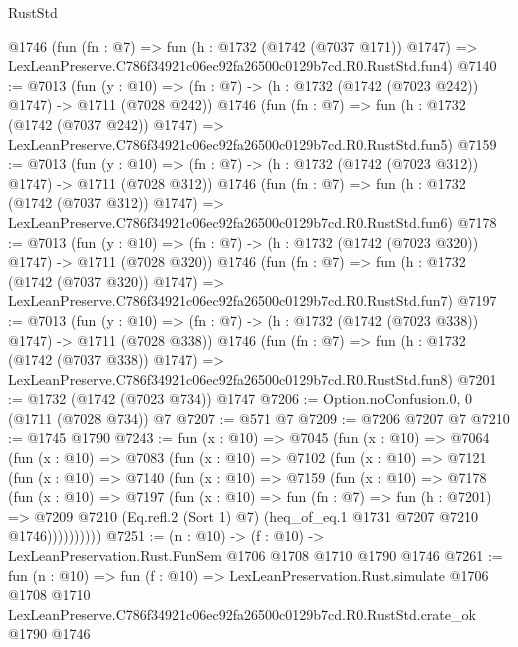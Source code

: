 \begin{lexlean}{RustStd}
\begin{coremodule}
    @1746
    (fun (fn : @7) =>
    fun (h : @1732 (@1742 (@7037 @171)) @1747) =>
    LexLeanPreserve.C786f34921c06ec92fa26500c0129b7cd.R0.RustStd.fun4)
@7140 := @7013
    (fun (y : @10) => (fn : @7) -> (h : @1732 (@1742 (@7023 @242)) @1747) -> @1711 (@7028 @242))
    @1746
    (fun (fn : @7) =>
    fun (h : @1732 (@1742 (@7037 @242)) @1747) =>
    LexLeanPreserve.C786f34921c06ec92fa26500c0129b7cd.R0.RustStd.fun5)
@7159 := @7013
    (fun (y : @10) => (fn : @7) -> (h : @1732 (@1742 (@7023 @312)) @1747) -> @1711 (@7028 @312))
    @1746
    (fun (fn : @7) =>
    fun (h : @1732 (@1742 (@7037 @312)) @1747) =>
    LexLeanPreserve.C786f34921c06ec92fa26500c0129b7cd.R0.RustStd.fun6)
@7178 := @7013
    (fun (y : @10) => (fn : @7) -> (h : @1732 (@1742 (@7023 @320)) @1747) -> @1711 (@7028 @320))
    @1746
    (fun (fn : @7) =>
    fun (h : @1732 (@1742 (@7037 @320)) @1747) =>
    LexLeanPreserve.C786f34921c06ec92fa26500c0129b7cd.R0.RustStd.fun7)
@7197 := @7013
    (fun (y : @10) => (fn : @7) -> (h : @1732 (@1742 (@7023 @338)) @1747) -> @1711 (@7028 @338))
    @1746
    (fun (fn : @7) =>
    fun (h : @1732 (@1742 (@7037 @338)) @1747) =>
    LexLeanPreserve.C786f34921c06ec92fa26500c0129b7cd.R0.RustStd.fun8)
@7201 := @1732 (@1742 (@7023 @734)) @1747
@7206 := Option.noConfusion.{0, 0} (@1711 (@7028 @734)) @7
@7207 := @571 @7
@7209 := @7206 @7207 @7
@7210 := @1745 @1790
@7243 := fun (x : @10) =>
  @7045
    (fun (x : @10) =>
    @7064
      (fun (x : @10) =>
      @7083
        (fun (x : @10) =>
        @7102
          (fun (x : @10) =>
          @7121
            (fun (x : @10) =>
            @7140
              (fun (x : @10) =>
              @7159
                (fun (x : @10) =>
                @7178
                  (fun (x : @10) =>
                  @7197
                    (fun (x : @10) =>
                    fun (fn : @7) =>
                    fun (h : @7201) =>
                    @7209
                      @7210
                      (Eq.refl.{2} (Sort 1) @7)
                      (heq_of_eq.{1} @1731 @7207 @7210 @1746))))))))))
@7251 := (n : @10) -> (f : @10) -> LexLeanPreservation.Rust.FunSem @1706 @1708 @1710 @1790 @1746
@7261 := fun (n : @10) =>
  fun (f : @10) =>
  LexLeanPreservation.Rust.simulate
    @1706
    @1708
    @1710
    LexLeanPreserve.C786f34921c06ec92fa26500c0129b7cd.R0.RustStd.crate_ok
    @1790
    @1746
\end{coremodule}
\end{lexlean}
